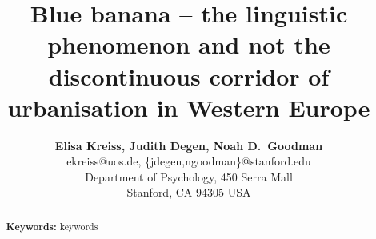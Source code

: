 \documentclass[10pt,letterpaper]{article}
\title{Blue banana -- the linguistic phenomenon and not the discontinuous corridor of urbanisation in Western Europe}
\author{{\large \bf Elisa Kreiss, Judith Degen, Noah D.~Goodman} \\
  ekreiss@uos.de, \{jdegen,ngoodman\}@stanford.edu\\
  Department of Psychology, 450 Serra Mall \\
  Stanford, CA 94305 USA}
\begin{document}
\maketitle


\begin{abstract}


\textbf{Keywords:} 
keywords
\end{abstract}


\end{document}
